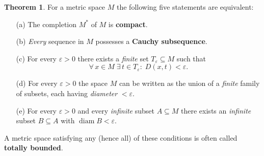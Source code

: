 \documentclass[12pt]{article}
\theoremstyle{definition} %
\newtheorem{theorem}{Theorem}
\theoremstyle{plain} %
\begin{document}
\begin{theorem}\label{thm:totally_bounded}
  For a metric space $M$ the following five statements are equivalent:
  \begin{enumerate}[label=\textup{(\alph*)}]
      \item[\textup{(a)}] The completion $M^{\!*}$ of $M$ is \textbf{compact}.
      \item[\textup{(b)}] \emph{Every} sequence in $M$ possesses a \textbf{Cauchy subsequence}.
      \item[\textup{(c)}] For every $\varepsilon>0$ there exists a \emph{finite} set
                         $T_\varepsilon\subseteq M$ such that
                         \[
                             \forall\,x\in M\;\exists\,t\in T_\varepsilon:\;
                             D(x,t)<\varepsilon .
                         \]
      \item[\textup{(d)}] For every $\varepsilon>0$ the space $M$ can be written as the
                         union of a \emph{finite} family of subsets, each having
                         \emph{diameter} $<\varepsilon$.
      \item[\textup{(e)}] For every $\varepsilon>0$ and every \emph{infinite} subset
                         $A\subseteq M$ there exists an \emph{infinite}
                         subset $B\subseteq A$ with $\operatorname{diam}B<\varepsilon$.
  \end{enumerate}
  A metric space satisfying any (hence all) of these conditions is often
  called \textbf{totally bounded}.
\end{theorem}
\end{document}
